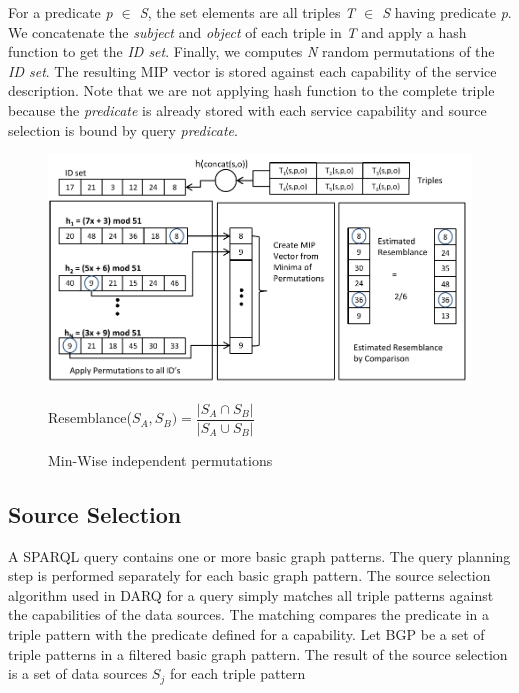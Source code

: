 \documentclass{sig-alternate}  %
\begin{document}
For a predicate \emph{p $\in$ S}, the set elements are all triples \emph{T $\in$
S} having predicate \emph{p}. We concatenate the \emph{subject}  and \emph{object} of each triple in \emph{T} and apply a hash function to get the \emph{ID set}. Finally, we computes \emph{N} random permutations of the \emph{ID set}. The resulting
MIP vector is stored against each capability of the service description. Note that we are not applying hash function to the complete triple because the \emph{predicate} is already stored with each service capability and source selection is bound by query \emph{predicate}.

\begin{figure}
\begin{centering}
\includegraphics[scale=0.5]{img/mips} 
\par\end{centering}
\centering Resemblance($S_A,S_B) = \dfrac{|S_A \cap S_B|}{|S_A \cup S_B|}$\\

\caption{Min-Wise independent permutations}
\end{figure}

\subsection{Source Selection}
A SPARQL query contains one or more basic graph patterns. The query planning
step is performed separately for each basic graph pattern.
The source selection algorithm used in DARQ for
a query simply matches all triple patterns against the capabilities
of the data sources. The matching compares the predicate in a triple
pattern with the predicate defined for a capability. Let BGP be a set of triple
patterns in a filtered basic graph pattern. The result of the source
selection is a set of data sources $S_j$ for each triple
pattern
\end{document}
